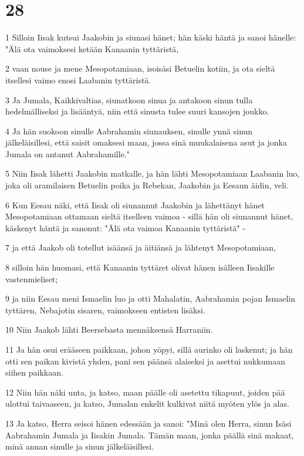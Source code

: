 \chapter{28}

\par 1 Silloin Iisak kutsui Jaakobin ja siunasi hänet; hän käski häntä ja sanoi hänelle: "Älä ota vaimoksesi ketään Kanaanin tyttäristä,
\par 2 vaan nouse ja mene Mesopotamiaan, isoisäsi Betuelin kotiin, ja ota sieltä itsellesi vaimo enosi Laabanin tyttäristä.
\par 3 Ja Jumala, Kaikkivaltias, siunatkoon sinua ja antakoon sinun tulla hedelmälliseksi ja lisääntyä, niin että sinusta tulee suuri kansojen joukko.
\par 4 Ja hän suokoon sinulle Aabrahamin siunauksen, sinulle ynnä sinun jälkeläisillesi, että saisit omaksesi maan, jossa sinä muukalaisena asut ja jonka Jumala on antanut Aabrahamille."
\par 5 Niin Iisak lähetti Jaakobin matkalle, ja hän lähti Mesopotamiaan Laabanin luo, joka oli aramilaisen Betuelin poika ja Rebekan, Jaakobin ja Eesaun äidin, veli.
\par 6 Kun Eesau näki, että Iisak oli siunannut Jaakobin ja lähettänyt hänet Mesopotamiaan ottamaan sieltä itselleen vaimoa - sillä hän oli siunannut hänet, käskenyt häntä ja sanonut: "Älä ota vaimoa Kanaanin tyttäristä" -
\par 7 ja että Jaakob oli totellut isäänsä ja äitiänsä ja lähtenyt Mesopotamiaan,
\par 8 silloin hän huomasi, että Kanaanin tyttäret olivat hänen isälleen Iisakille vastenmieliset;
\par 9 ja niin Eesau meni Ismaelin luo ja otti Mahalatin, Aabrahamin pojan Ismaelin tyttären, Nebajotin sisaren, vaimokseen entisten lisäksi.
\par 10 Niin Jaakob lähti Beersebasta mennäksensä Harraniin.
\par 11 Ja hän osui erääseen paikkaan, johon yöpyi, sillä aurinko oli laskenut; ja hän otti sen paikan kivistä yhden, pani sen päänsä alaiseksi ja asettui nukkumaan siihen paikkaan.
\par 12 Niin hän näki unta, ja katso, maan päälle oli asetettu tikapuut, joiden pää ulottui taivaaseen, ja katso, Jumalan enkelit kulkivat niitä myöten ylös ja alas.
\par 13 Ja katso, Herra seisoi hänen edessään ja sanoi: "Minä olen Herra, sinun Isäsi Aabrahamin Jumala ja Iisakin Jumala. Tämän maan, jonka päällä sinä makaat, minä annan sinulle ja sinun jälkeläisillesi.
